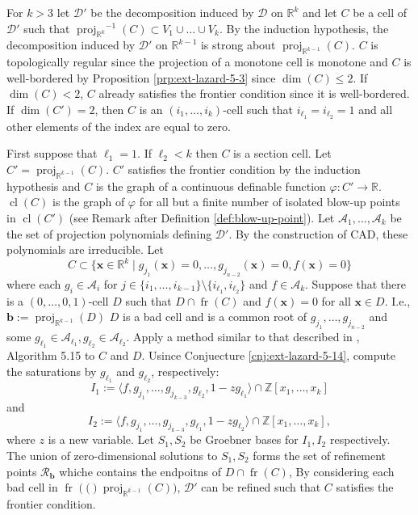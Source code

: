 \documentclass[
]{book}
\theoremstyle{definition}
\theoremstyle{definition}
\theoremstyle{definition}
\theoremstyle{definition}
\theoremstyle{remark}
\begin{document}
For \(k>3\) let \(\mathcal{D'}\) be the decomposition induced by \(\mathcal{D}\) on \(\mathbb{R}^k\) and let \(C\) be a cell of \(\mathcal{D'}\) such that \({\operatorname{proj}_{\mathbb{R}^{k}}}^{-1}(C) \subset V_1 \cup \ldots \cup V_k\).
By the induction hypothesis, the decomposition induced by \(\mathcal{D'}\) on \(\mathbb{R}^{k-1}\) is strong about \({\operatorname{proj}_{\mathbb{R}^{k-1}}}(C)\).
\(C\) is topologically regular since the projection of a monotone cell is monotone and \(C\) is well-bordered by Proposition \ref{prp:ext-lazard-5-3} since \(\dim(C) \le 2\).
If \(\dim(C) < 2\), \(C\) already satisfies the frontier condition since it is well-bordered.
If \(\dim(C') = 2\), then \(C\) is an \((i_1,\ldots,i_k)\)-cell such that \(i_{\ell_1} = i_{\ell_2} = 1\) and all other elements of the index are equal to zero.

First suppose that \(\ell_1 = 1\). If \(\ell_2 < k\) then \(C\) is a section cell.
Let \(C' = {\operatorname{proj}_{\mathbb{R}^{k-1}}}(C)\). \(C'\) satisfies the frontier condition by the induction hypothesis and \(C\) is the graph of a continuous definable function \(\varphi : C' \to \mathbb{R}\).
\({\operatorname{cl} \left( C \right)}\) is the graph of \(\varphi\) for all but a finite number of isolated blow-up points in \({\operatorname{cl} \left( C' \right)}\) (see Remark after Definition \ref{def:blow-up-point}).
Let \(\mathcal{A}_1,\ldots,\mathcal{A}_k\) be the set of projection polynomials defining \(\mathcal{D'}\). By the construction of CAD, these polynomials are irreducible. Let
\[
C \subset \{ \mathbf{x} \in \mathbb{R}^k \mid g_{j_1}(\mathbf{x}) = 0, \ldots, g_{j_{n-2}}(\mathbf{x}) = 0, f(\mathbf{x}) = 0 \}
\]
where each \(g_i \in \mathcal{A}_i\) for \(j \in \{i_1,\ldots,i_{k-1}\} \setminus \{i_{\ell_1}, i_{\ell_2} \}\) and \(f \in \mathcal{A}_k\).
Suppose that there is a \((0,\ldots,0,1)\)-cell \(D\) such that \(D \cap {\operatorname{fr} \left( C \right)}\) and \(f(\mathbf{x}) = 0\) for all \(\mathbf{x} \in D\). I.e., \(\mathbf{b} := {\operatorname{proj}_{\mathbb{R}^{k-1}}}(D)\) \(D\) is a bad cell and is a common root of \(g_{j_1}, \ldots, g_{j_{n-2}}\) and some \(g_{\ell_1} \in \mathcal{A}_{\ell_1}, g_{\ell_2} \in \mathcal{A}_{\ell_2}\).
Apply a method similar to that described in \citet{lazard10}, Algorithm 5.15 to \(C\) and \(D\). Usince Conjuecture \ref{cnj:ext-lazard-5-14}, compute the saturations by \(g_{\ell_1}\) and \(g_{\ell_2}\), respectively:
\[
I_1 := \langle f, g_{j_1}, \ldots, g_{j_{k-3}}, g_{\ell_2}, 1 - z g_{\ell_1} \rangle \cap \mathbb{Z}[x_1,\ldots,x_k]
\]
and
\[
I_2 := \langle f, g_{j_1}, \ldots, g_{j_{k-3}}, g_{\ell_1}, 1 - z g_{\ell_2} \rangle \cap \mathbb{Z}[x_1,\ldots,x_k],
\]
where \(z\) is a new variable.
Let \(S_1, S_2\) be Groebner bases for \(I_1,I_2\) respectively. The union of zero-dimensional solutions to \(S_1,S_2\) forms the set of refinement points \(\mathcal{R}_\mathbf{b}\) whiche contains the endpoitns of \(D \cap {\operatorname{fr} \left( C \right)}\), By considering each bad cell in \({\operatorname{fr} \left( ( \right)}{\operatorname{proj}_{\mathbb{R}^{k-1}}}(C))\), \(\mathcal{D}'\) can be refined such that \(C\) satisfies the frontier condition.
\end{document}
